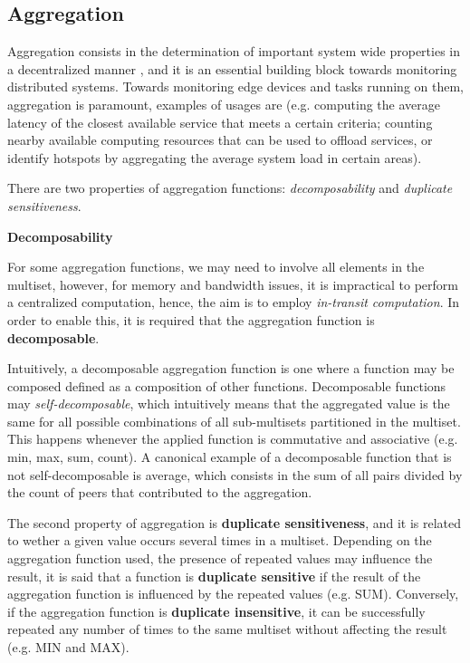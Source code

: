\subsection{Aggregation}

Aggregation consists in the determination of important system wide properties in a decentralized manner \cite{DBLP:journals/corr/abs-1110-0725}, and it is an essential building block towards monitoring distributed systems. Towards monitoring edge devices and tasks running on them, aggregation is paramount, examples of usages are (e.g. computing the average latency of the closest available  service that meets a certain criteria; counting nearby available computing resources that can be used to offload services, or identify hotspots by aggregating the average system load in certain areas).

There are two properties of aggregation functions: \textit{decomposability} and \textit{duplicate sensitiveness}.

\textbf{Decomposability}

For some aggregation functions, we may need to involve all elements in the multiset, however, for memory and bandwidth issues, it is impractical to perform a centralized computation, hence, the aim is to employ \textit{in-transit computation}. In order to enable this, it is required that the aggregation function is \textbf{decomposable}. 

Intuitively, a decomposable aggregation function is one where a function may be composed defined as a composition of other functions. Decomposable functions may \textit{self-decomposable}, which intuitively means that the aggregated value is the same for all possible combinations of all sub-multisets partitioned in the multiset. This happens whenever the applied function is commutative and associative (e.g. min, max, sum, count). A canonical example of a decomposable function that is not self-decomposable is average, which consists in the sum of all pairs divided by the count of peers that contributed to the aggregation.

The second property of aggregation is \textbf{duplicate sensitiveness}, and it is related to wether a given value occurs several times in a multiset. Depending on the aggregation function used, the presence of repeated values may influence the result, it is said that a function is \textbf{duplicate sensitive} if the result of the aggregation function is influenced by the repeated values (e.g. SUM). Conversely, if the aggregation function is \textbf{duplicate insensitive}, it can be successfully repeated any number of times to the same multiset without affecting the result (e.g. MIN and MAX).

